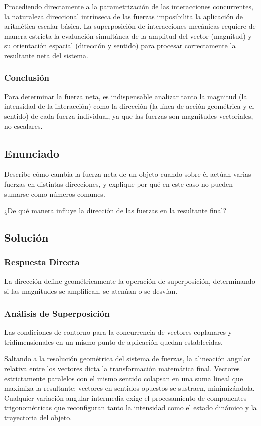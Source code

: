 \documentclass[12pt, a4paper]{article}
\begin{document}
Procediendo directamente a la parametrización de las interacciones concurrentes, la naturaleza direccional intrínseca de las fuerzas imposibilita la aplicación de aritmética escalar básica. La superposición de interacciones mecánicas requiere de manera estricta la evaluación simultánea de la amplitud del vector (magnitud) y su orientación espacial (dirección y sentido) para procesar correctamente la resultante neta del sistema.

\subsubsection*{Conclusión}
Para determinar la fuerza neta, es indispensable analizar tanto la magnitud (la intensidad de la interacción) como la dirección (la línea de acción geométrica y el sentido) de cada fuerza individual, ya que las fuerzas son magnitudes vectoriales, no escalares.

\newpage

\subsection*{Enunciado}
Describe cómo cambia la fuerza neta de un objeto cuando sobre él actúan varias fuerzas en distintas direcciones, y explique por qué en este caso no pueden sumarse como números comunes. 

¿De qué manera influye la dirección de las fuerzas en la resultante final?

\subsection*{Solución}

\subsubsection*{Respuesta Directa}
La dirección define geométricamente la operación de superposición, determinando si las magnitudes se amplifican, se atenúan o se desvían.

\subsubsection*{Análisis de Superposición}
Las condiciones de contorno para la concurrencia de vectores coplanares y tridimensionales en un mismo punto de aplicación quedan establecidas. 

Saltando a la resolución geométrica del sistema de fuerzas, la alineación angular relativa entre los vectores dicta la transformación matemática final. Vectores estrictamente paralelos con el mismo sentido colapsan en una suma lineal que maximiza la resultante; vectores en sentidos opuestos se sustraen, minimizándola. Cualquier variación angular intermedia exige el procesamiento de componentes trigonométricas que reconfiguran tanto la intensidad como el estado dinámico y la trayectoria del objeto.
\end{document}
